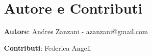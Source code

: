 \section{Autore e Contributi}

\textbf{Autore}: Andres Zanzani - azanzani@gmail.com

\medskip

\noindent\textbf{Contributi}: Federica Angeli
